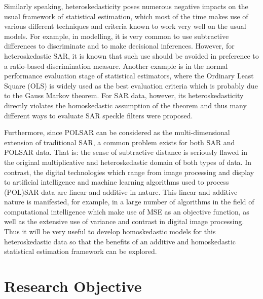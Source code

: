 Similarly speaking, heteroskedasticity poses numerous negative impacts on the usual framework of statistical estimation, which most of the time makes use of various different techniques and criteria known to work very well on the usual models.
For example, in modelling, it is very common to use subtractive differences to discriminate and to make decisional inferences. However, for heteroskedastic SAR, it is known that such use should be avoided in preference to a ratio-based discrimination measure.
Another example is in the normal performance evaluation stage of statistical estimators, where the Ordinary Least Square (OLS) is widely used as the best evaluation criteria which is probably due to the Gauss Markov theorem.
For SAR data, however, its heteroskedasticity directly violates the homoskedastic assumption of the theorem and thus many different ways to evaluate SAR speckle filters were proposed.

Furthermore, since POLSAR can be considered as the multi-dimensional extension of
traditional SAR, a common problem exists for both SAR and POLSAR data. That
is: the sense of subtractive distance is seriously flawed in the original multiplicative
and heteroskedastic domain of both types of data. 
In contrast, the digital technologies which range from image processing and display to artificial intelligence and machine learning algorithms used to process (POL)SAR data are linear
and additive in nature. 
This linear and additive nature is manifested, for example, in a
large number of algorithms in the field of computational intelligence which make use of
MSE as an objective function, as well as the extensive use of variance and
contrast in digital image processing. 
Thus it will be very useful to develop homoskedastic models for this heteroskedastic data
  so that the benefits of an additive and homoskedastic statistical estimation framework can be explored.



\section{Research Objective}

